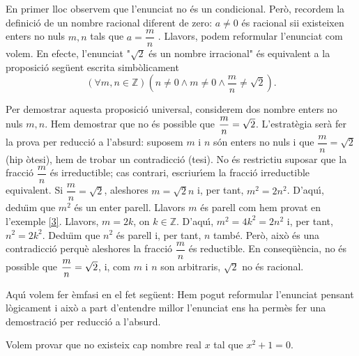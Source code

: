 \begin{solucio}
En primer lloc observem que l'enunciat no \'{e}s un condicional. Per\`{o},
recordem la definici\'{o} de un nombre racional diferent de zero: $a\neq0$
\'{e}s racional sii existeixen enters no nuls $m,n$ tals que $a=\dfrac{m}{n}$%
. Llavors, podem reformular l'enunciat com volem. En efecte, l'enunciat "$%
\sqrt{2}$ \'{e}s un nombre irracional" \'{e}s equivalent a la proposici\'{o}
seg\"{u}ent escrita simb\`{o}licament
\begin{equation*}
\left( \forall m,n\in\mathbb{Z}\right) \left( n\neq0\wedge m\neq 0\wedge%
\frac{m}{n}\neq\sqrt{2}\right) .
\end{equation*}

Per demostrar aquesta proposici\'{o} universal, considerem dos nombre enters
no nuls $m,n$. Hem demostrar que no \'{e}s possible que $\dfrac{m}{n}=\sqrt {%
2}$. L'estrat\`{e}gia ser\`{a} fer la prova per reducci\'{o} a l'absurd:
suposem $m$ i $n$ s\'{o}n enters no nuls i que $\dfrac{m}{n}=\sqrt{2}$ (hip%
\`{o}tesi), hem de trobar un contradicci\'{o} (tesi). No \'{e}s restrictiu
suposar que la fracci\'{o} $\dfrac{m}{n}$ \'{e}s irreductible; cas contrari,
escriur\'{\i}em la fracci\'{o} irreductible equivalent. Si $\dfrac{m}{n}=%
\sqrt{2}$, aleshores $m=\sqrt{2}n$ i, per tant, $m^{2}=2n^{2}$. D'aqu\'{\i},
dedu\"{\i}m que $m^{2}$ \'{e}s un enter parell. Llavors $m$ \'{e}s parell
com hem provat en l'exemple \ref{3}. Llavors, $m=2k$, on $k\in\mathbb{Z}$.
D'aqu\'{\i}, $m^{2}=4k^{2}=2n^{2}$ i, per tant, $n^{2}=2k^{2}$. Dedu\"{\i}m
que $n^{2}$ \'{e}s parell i, per tant, $n$ tamb\'{e}. Per\`{o}, aix\`{o}
\'{e}s una contradicci\'{o} perqu\`{e} aleshores la fracci\'{o} $\dfrac{m}{n}
$ \'{e}s reductible. En conseq\"{u}\`{e}ncia, no \'{e}s possible que $\dfrac{%
m}{n}=\sqrt{2}$, i, com $m$ i $n$ son arbitraris, $\sqrt{2}$ no \'{e}s
racional.

Aqu\'{\i} volem fer \`{e}mfasi en el fet seg\"{u}ent: Hem pogut reformular
l'enunciat pensant l\`{o}gicament i aix\`{o} a part d'entendre millor
l'enunciat ens ha perm\`{e}s fer una demostraci\'{o} per reducci\'{o} a
l'absurd.
\end{solucio}

\begin{exemple}
Volem provar que no existeix cap nombre real $x$ tal que $x^{2}+1=0$.
\end{exemple}

